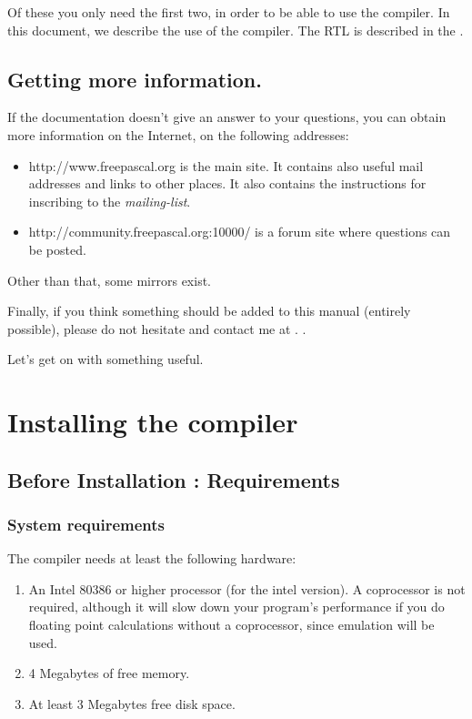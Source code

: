 Of these you only need the first two, in order to be able to use the compiler.
In this document, we describe the use of the compiler. The RTL is described in the
.

\section{Getting more information.}
If the documentation doesn't give an answer to your questions,
you can obtain more information on the Internet, on the following addresses:
\begin{itemize}
\item
{}
{http://www.freepascal.org} is the main
site. It contains also useful mail addresses and
links to other places.
It also contains the instructions for inscribing to the
\textit{mailing-list}.

\item
{}
{http://community.freepascal.org:10000/} is a forum site where
questions can be posted.
\end{itemize}
Other than that, some mirrors exist.

Finally, if you think something should be added to this manual
(entirely possible), please do not hesitate and contact me at
.
.

Let's get on with something useful.


\chapter{Installing the compiler}
\label{ch:Installation}

\section{Before Installation : Requirements}

%
%
\subsection{System requirements}
The compiler needs at least the following hardware:
\begin{enumerate}
\item An Intel 80386 or higher processor (for the intel version). A coprocessor 
is not required, although it will slow down your program's performance if you do 
floating point calculations without a coprocessor, since emulation will be used.
\item 4 Megabytes of free memory. 
\item At least 3 Megabytes free disk space.
\end{enumerate}

